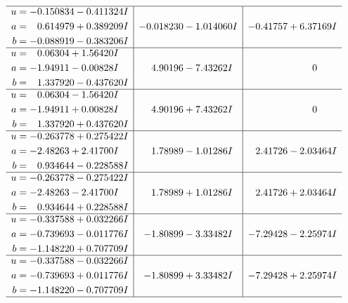 \documentclass[1p]{elsarticle_modified}
\theoremstyle{definition}
\begin{document}
$$\begin{array}{c|c|c}
 \hline 
\begin{aligned}
u &= -0.150834 - 0.411324 I \\
a &= \phantom{-}0.614979 + 0.389209 I \\
b &= -0.088919 - 0.383206 I\end{aligned}
 & -0.018230 - 1.014060 I & -0.41757 + 6.37169 I \\ \hline\begin{aligned}
u &= \phantom{-}0.06304 + 1.56420 I \\
a &= -1.94911 - 0.00828 I \\
b &= \phantom{-}1.337920 - 0.437620 I\end{aligned}
 & \phantom{-}4.90196 - 7.43262 I & \phantom{-0.000000 } 0 \\ \hline\begin{aligned}
u &= \phantom{-}0.06304 - 1.56420 I \\
a &= -1.94911 + 0.00828 I \\
b &= \phantom{-}1.337920 + 0.437620 I\end{aligned}
 & \phantom{-}4.90196 + 7.43262 I & \phantom{-0.000000 } 0 \\ \hline\begin{aligned}
u &= -0.263778 + 0.275422 I \\
a &= -2.48263 + 2.41700 I \\
b &= \phantom{-}0.934644 - 0.228588 I\end{aligned}
 & \phantom{-}1.78989 - 1.01286 I & \phantom{-}2.41726 - 2.03464 I \\ \hline\begin{aligned}
u &= -0.263778 - 0.275422 I \\
a &= -2.48263 - 2.41700 I \\
b &= \phantom{-}0.934644 + 0.228588 I\end{aligned}
 & \phantom{-}1.78989 + 1.01286 I & \phantom{-}2.41726 + 2.03464 I \\ \hline\begin{aligned}
u &= -0.337588 + 0.032266 I \\
a &= -0.739693 - 0.011776 I \\
b &= -1.148220 + 0.707709 I\end{aligned}
 & -1.80899 - 3.33482 I & -7.29428 - 2.25974 I \\ \hline\begin{aligned}
u &= -0.337588 - 0.032266 I \\
a &= -0.739693 + 0.011776 I \\
b &= -1.148220 - 0.707709 I\end{aligned}
 & -1.80899 + 3.33482 I & -7.29428 + 2.25974 I\\
 \hline 
 \end{array}$$\newpage\newpage\renewcommand{\arraystretch}{1}
\end{document}

